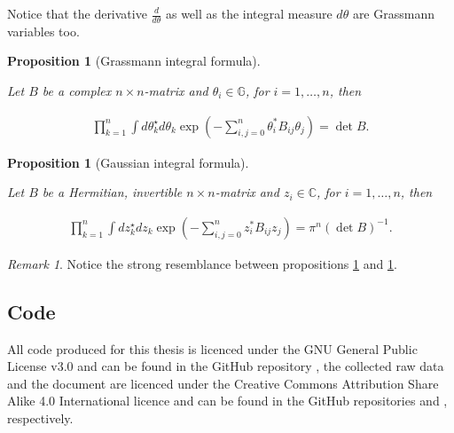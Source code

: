 \documentclass{article}
\theoremstyle{plain} %
\newtheorem{prop}[theorem]{Proposition}
\theoremstyle{convention} %
\theoremstyle{remark} %
\newtheorem*{remark}{Remark} %
\newcommand\listofproposals{\tcblistof[\subsection]{pp}{List of Proposals}}
\numberwithin{equation}{section}
\begin{document}
\begin{appendix}
Notice that the derivative $\frac{d}{d \theta}$ as well as the integral measure $d \theta$ are Grassmann variables too.

\begin{prop}[Grassmann integral formula]

\label{prop:grassmann_integral}

Let $B$ be a complex $n \times n$-matrix and $\theta_i \in \mathbb{G}$, for $i = 1, \dots, n$, then

\begin{align*}
  \prod_{k=1}^n \int d \theta_k^{\star} d \theta_k \exp( - \sum_{i,j=0}^n \theta_i^{*} B_{ij} \theta_j ) = \det B.
\end{align*}

\end{prop}

\begin{prop}[Gaussian integral formula]

\label{prop:gauss_integral}

Let $B$ be a Hermitian, invertible $n \times n$-matrix and $z_i \in \mathbb{C}$, for $i = 1, \dots, n$, then

\begin{align*}
  \prod_{k=1}^n \int d z_k^{\star} d z_k \exp( - \sum_{i,j=0}^n z_i^{*} B_{ij} z_j ) = \pi^n (\det B)^{-1}.
\end{align*}

\end{prop}

\begin{remark}
  Notice the strong resemblance between propositions \ref{prop:grassmann_integral} and \ref{prop:gauss_integral}.
\end{remark}

\subsection{Code}
\label{sec:code}

All code produced for this thesis is licenced under the GNU General Public License v3.0 and can be found in the GitHub repository \cite{github_code}, the collected raw data and the document are licenced under the Creative Commons Attribution Share Alike 4.0 International licence and can be found in the GitHub repositories \cite{github_data} and \cite{github_doc}, respectively.

\listofproposals

\label{sec:proposals}

\end{appendix}

\printglossary[type=\acronymtype]

\printglossary
\end{document}
